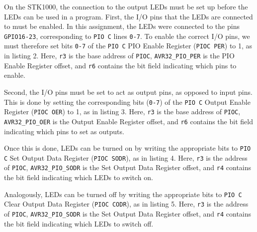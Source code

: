 On the STK1000, the connection to the output LEDs must be set up before the LEDs can be used in a program.
First, the I/O pins that the LEDs are connected to must be enabled.
In this assignment, the LEDs were connected to the pins \texttt{GPIO16-23}, corresponding to \texttt{PIO C} lines \texttt{0-7}.
To enable the correct I/O pins, we must therefore set bits \texttt{0-7} of the \texttt{PIO C} PIO Enable Register (\texttt{PIOC PER}) to 1, as in listing 2.
Here, \texttt{r3} is the base address of \texttt{PIOC}, \texttt{AVR32\_PIO\_PER} is the PIO Enable Register offset, and \texttt{r6} contains the bit field indicating which pins to enable.


Second, the I/O pins must be set to act as output pins, as opposed to input pins.
This is done by setting the corresponding bits (\texttt{0-7}) of the \texttt{PIO C} Output Enable Register (\texttt{PIOC OER}) to 1, as in listing 3.
Here, \texttt{r3} is the base address of \texttt{PIOC}, \texttt{AVR32\_PIO\_OER} is the Output Enable Register offset, and \texttt{r6} contains the bit field indicating which pins to set as outputs.


Once this is done, LEDs can be turned on by writing the appropriate bits to \texttt{PIO C} Set Output Data Register (\texttt{PIOC SODR}), as in listing 4.
Here, \texttt{r3} is the address of \texttt{PIOC}, \texttt{AVR32\_PIO\_SODR} is the Set Output Data Register offset, and \texttt{r4} contains the bit field indicating which LEDs to switch on.


Analogously, LEDs can be turned off by writing the appropriate bits to \texttt{PIO C} Clear Output Data Register (\texttt{PIOC CODR}), as in listing 5. 
Here, \texttt{r3} is the address of \texttt{PIOC}, \texttt{AVR32\_PIO\_SODR} is the Set Output Data Register offset, and \texttt{r4} contains the bit field indicating which LEDs to switch off.

